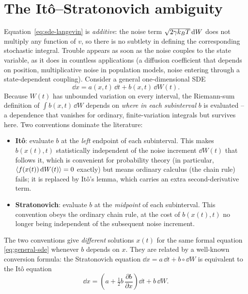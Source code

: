 \section{The It\^o--Stratonovich ambiguity}
\label{sec:ito}

Equation~\eqref{eq:sde-langevin} is \emph{additive}: the noise term
$\sqrt{2\gamma k_{B} T}\,\mathrm{d} W$ does not multiply any function of $v$, so there
is no subtlety in defining the corresponding stochastic integral. Trouble
appears as soon as the noise couples to the state variable, as it does in
countless applications (a diffusion coefficient that depends on position,
multiplicative noise in population models, noise entering through a
state-dependent coupling). Consider a general one-dimensional SDE
\begin{equation}
\dd x = a(x,t)\,\dd t + b(x,t)\,\dd W(t).
\label{eq:general-sde}
\end{equation}
Because $W(t)$ has unbounded variation on every interval, the Riemann-sum
definition of $\int b(x,t)\,\dd W$ depends on \emph{where in each
subinterval} $b$ is evaluated -- a dependence that vanishes for ordinary,
finite-variation integrals but survives here. Two conventions dominate the
literature:
\begin{itemize}[leftmargin=1.6em]
\item \textbf{It\^o}: evaluate $b$ at the \emph{left} endpoint of each
subinterval. This makes $b(x(t),t)$ statistically independent of the noise
increment $\dd W(t)$ that follows it, which is convenient for probability
theory (in particular, $\left\langle f(x(t))\,\mathrm{d} W(t) \right\rangle = 0$ exactly) but means
ordinary calculus (the chain rule) fails; it is replaced by It\^o's lemma,
which carries an extra second-derivative term.
\item \textbf{Stratonovich}: evaluate $b$ at the \emph{midpoint} of each
subinterval. This convention obeys the ordinary chain rule, at the cost of
$b(x(t),t)$ no longer being independent of the subsequent noise increment.
\end{itemize}
The two conventions give \emph{different} solutions $x(t)$ for the same
formal equation \eqref{eq:general-sde} whenever $b$ depends on $x$. They are
related by a well-known conversion formula: the Stratonovich equation
$\dd x = a\,\dd t + b\circ \dd W$ is equivalent to the It\^o equation
\begin{equation}
\dd x = \left(a + \tfrac{1}{2} b\,\frac{\partial b}{\partial x}\right)\dd t + b\,\dd W.
\label{eq:ito-strat}
\end{equation}

